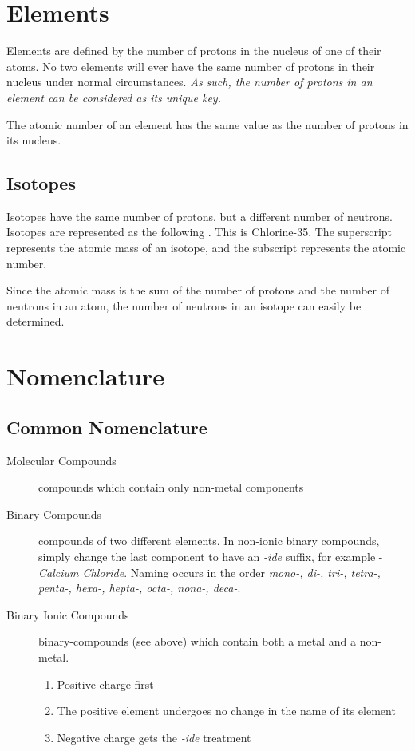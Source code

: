 \section{Elements}
Elements are defined by the number of protons in the nucleus of one of their
atoms.  No two elements will ever have the same number of protons in their
nucleus under normal circumstances.  \textit{As such, the number of protons in
an element can be considered as its unique key.}

The atomic number of an element has the same value as the number of protons in
its nucleus.

\subsection{Isotopes}
Isotopes have the same number of protons, but a different number of neutrons.
Isotopes are represented as the following .  This is
Chlorine-35.  The superscript represents the atomic mass of an isotope, and the
subscript represents the atomic number.

Since the atomic mass is the sum of the number of protons and the number of
neutrons in an atom, the number of neutrons in an isotope can easily be
determined.

\section{Nomenclature}
\subsection{Common Nomenclature}
\begin{description}
  \item[Molecular Compounds] compounds which contain only non-metal components
  \item[Binary Compounds] compounds of two different elements.  In non-ionic
    binary compounds, simply change the last component to have an \textit{-ide}
    suffix, for example  - \textit{Calcium Chloride}.  Naming occurs
    in the order \textit{mono-, di-, tri-, tetra-, penta-, hexa-, hepta-, octa-,
    nona-, deca-}.
  \item[Binary Ionic Compounds] binary-compounds (see above) which contain both
    a metal and a non-metal.
    \begin{enumerate}
      \item Positive charge first
      \item The positive element undergoes no change in the name of its element
      \item Negative charge gets the \textit{-ide} treatment
    \end{enumerate}
\end{description}

